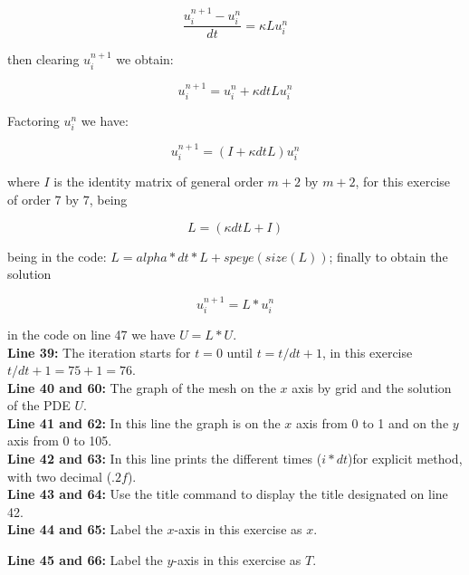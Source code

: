 \documentclass[a4paper,abstract=true]{scrreprt}
\begin{document}
\begin{equation}
	\frac{u^{n+1}_{i} - u^{n}_{i} }{dt} = \kappa L 	u^{n}_{i}
\end{equation}

then clearing $u^{n+1}_{i}$ we obtain:


\begin{equation}
	u^{n+1}_{i} = u^{n}_{i}  +  \kappa dt L u^{n}_{i}
\end{equation}

Factoring $u^{n}_{i}$ we have:

\begin{equation}
	u^{n+1}_{i} = (I  +  \kappa dt L )u^{n}_{i}
\end{equation}

where $I$ is the identity matrix of general order $m+2$ by $m+2$, for this exercise of order $7$ by $7$, being

$$  L = (\kappa dt L +I )$$

being in the code: $ L = alpha*dt*L + speye(size(L))$; finally to obtain the solution

\begin{equation}
	u^{n+1}_{i} = L *u^{n}_{i}
\end{equation}

in the code on line 47 we have $ U = L*U.$\\


\textbf{Line 39:} The iteration starts for $t=0$ until $t=t/dt+1$, in this exercise $t/dt+1= 75+1=76$.\\


\textbf{Line 40 and 60:} The graph of the mesh on the $x$ axis by grid and the solution of the PDE $U$. \\


\textbf{Line 41 and 62:} In this line the graph is on the $x$ axis from 0 to 1 and on the $y$ axis from 0 to 105.\\

 
\textbf{Line 42 and 63:} In this line prints the different times ($ i* dt$)for explicit method, with two decimal  ($ .2f $).\\


\textbf{Line 43 and 64:} Use the title command to display the title designated on line 42. \\


\textbf{Line 44 and 65:} Label the $x$-axis in this exercise as $x$.


\textbf{Line 45 and 66:} Label the $y$-axis in this exercise as $T$.\\
\end{document}
